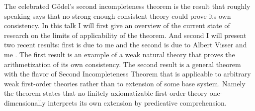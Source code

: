 \documentclass[bsl,meeting]{asl}
\newcommand{\NP}{}
\begin{document}
\thispagestyle{empty}


\NP%
%
%
%
%

The celebrated  Gödel's second incompleteness theorem is the result that roughly speaking says that no strong enough consistent theory could prove its own consistency. In this talk I will first give an overview of the current state of research on the limits of applicability of the theorem. And second I will present two recent results: first is due to me \cite{Pak19} and the second is due to Albert Visser and me \cite{PV21}. The first result is an example of a weak natural theory that proves the arithmetization of its own consistency. The second result is a general theorem with the flavor of Second Incompleteness Theorem that is applicable to arbitrary weak first-order theories rather than to extension of some base system. Namely the theorem states that no finitely axiomatizable first-order theory one-dimensionally interprets its own extension by predicative comprehension.\\



\end{document}
